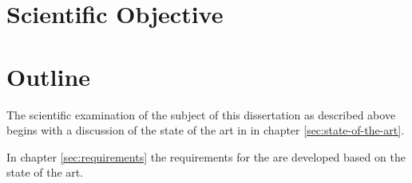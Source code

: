 \section{Scientific Objective}
\label{sec:scientific-objective}

\section{Outline}
\label{sec:outline}
The scientific examination of the subject of this dissertation as described above begins with a discussion of the state of the art in  in chapter \ref{sec:state-of-the-art}.

In chapter \ref{sec:requirements} the requirements for the \topic are developed based on the state of the art.


